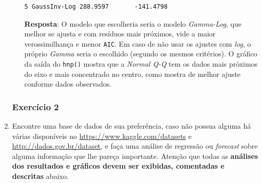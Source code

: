 \documentclass[a4paper,12pt]{article}
\begin{document}
\begin{enumerate}
\begin{enumerate}
\begin{lstlisting}
5 GaussInv-Log 288.9597       -141.4798
            \end{lstlisting}
        \textbf{Resposta}: O modelo que escolheria seria o modelo \textit{Gamma-Log}, que melhor se ajusta e com resíduos mais próximos, vide a maior verossimilhança e menor \texttt{AIC}. Em caso de não usar os ajustes com \textit{log}, o próprio \textit{Gamma} seria o escolhido (segundo os mesmos critérios). O gráfico da saída do \texttt{hnp()} mostra que a \textit{Normal Q-Q} tem os dados mais próximos do eixo e mais concentrado no centro, como mostra de melhor ajuste conforme dados observados. 
    \end{enumerate}

\subsubsection{Exercício 2}

    \item Encontre uma base de dados de sua preferência, caso não possua alguma há várias disponíveis no \url{https://www.kaggle.com/datasets} e \url{http://dados.gov.br/dataset}, e faça uma análise de regressão ou \textit{forecast} sobre alguma informação que lhe pareça importante. Atenção que todas as \textbf{análises dos resultados e gráficos devem ser exibidas, comentadas e descritas} abaixo.\\
    

\end{enumerate}
\end{document}
